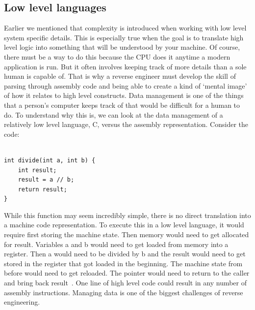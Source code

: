 \subsection{Low level languages}
Earlier we mentioned that complexity is introduced when working with low level system specific details. 
This is especially true when the goal is to translate high level logic into something that will be understood by your machine. 
Of course, there must be a way to do this because the CPU does it anytime a modern application is run. 
But it often involves keeping track of more details than a sole human is capable of. 
That is why a reverse engineer must develop the skill of parsing through assembly code and being able to create a kind of ‘mental image’ of how it relates to high level constructs.
Data management is one of the things that a person’s computer keeps track of that would be difficult for a human to do.
 To understand why this is, we can look at the data management of a relatively low level language, C, versus the assembly representation. 
 Consider the code: 
\begin{lstlisting}

int divide(int a, int b) {
    int result;
    result = a // b;
    return result;
}
\end{lstlisting}
While this function may seem incredibly simple, there is no direct translation into a machine code representation. 
To execute this in a low level language, it would require first storing the machine state. 
Then memory would need to get allocated for result. Variables a and b would need to get loaded from memory into a register. 
Then a would need to be divided by b and the result would need to get stored in the register that got loaded in the beginning. 
The machine state from before would need to get reloaded. The pointer would need to return to the caller and bring back result~\cite{Reversing}.
One line of high level code could result in any number of assembly instructions.
Managing data is one of the biggest challenges of reverse engineering.


